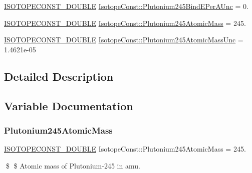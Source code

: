 \begin{DoxyCompactItemize}
\mbox{\hyperlink{group___isotope_const-_macros_ga8f45a7272ce02c0b4c65c44636ed719a}{I\+S\+O\+T\+O\+P\+E\+C\+O\+N\+S\+T\+\_\+\+D\+O\+U\+B\+LE}} \mbox{\hyperlink{group___isotope_const-_plutonium-_pu245_ga3bca8ad4bc8fe53ea2de1188cef56844}{Isotope\+Const\+::\+Plutonium245\+Bind\+E\+Per\+A\+Unc}} = 0.
\item 
\mbox{\hyperlink{group___isotope_const-_macros_ga8f45a7272ce02c0b4c65c44636ed719a}{I\+S\+O\+T\+O\+P\+E\+C\+O\+N\+S\+T\+\_\+\+D\+O\+U\+B\+LE}} \mbox{\hyperlink{group___isotope_const-_plutonium-_pu245_ga9ac39f7aaac8421043836ce414b1098e}{Isotope\+Const\+::\+Plutonium245\+Atomic\+Mass}} = 245.
\item 
\mbox{\hyperlink{group___isotope_const-_macros_ga8f45a7272ce02c0b4c65c44636ed719a}{I\+S\+O\+T\+O\+P\+E\+C\+O\+N\+S\+T\+\_\+\+D\+O\+U\+B\+LE}} \mbox{\hyperlink{group___isotope_const-_plutonium-_pu245_gacf9c68654639d8dea8c7a6fd9d412c39}{Isotope\+Const\+::\+Plutonium245\+Atomic\+Mass\+Unc}} = 1.\+4621e-\/05
\end{DoxyCompactItemize}


\subsection{Detailed Description}


\subsection{Variable Documentation}
\mbox{\label{group___isotope_const-_plutonium-_pu245_ga9ac39f7aaac8421043836ce414b1098e}} 
\subsubsection{\texorpdfstring{Plutonium245\+Atomic\+Mass}{Plutonium245AtomicMass}}
{\footnotesize\ttfamily \mbox{\hyperlink{group___isotope_const-_macros_ga8f45a7272ce02c0b4c65c44636ed719a}{I\+S\+O\+T\+O\+P\+E\+C\+O\+N\+S\+T\+\_\+\+D\+O\+U\+B\+LE}} Isotope\+Const\+::\+Plutonium245\+Atomic\+Mass = 245.}

\$ \$ Atomic mass of Plutonium-\/245 in amu. \mbox{\label{group___isotope_const-_plutonium-_pu245_gacf9c68654639d8dea8c7a6fd9d412c39}} 
